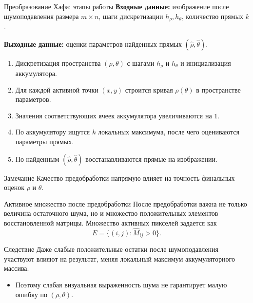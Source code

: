 \documentclass[unicode,notheorems]{beamer}
\begin{document}
\begin{frame}[shrink=5]{Преобразование Хафа: этапы работы}
	\textbf{Входные данные:} изображение после шумоподавления размера $m \times n$, шаги дискретизации $h_{\rho}, h_{\theta}$, количество прямых $k$.

	\vspace{0.1cm}
	\textbf{Выходные данные:} оценки параметров найденных прямых $(\hat{\rho},\hat{\theta})$.

	\vspace{0.2cm}
	\begin{enumerate}
		\item Дискретизация пространства $(\rho,\theta)$ с шагами $h_\rho$ и $h_\theta$ и инициализация аккумулятора.
		\item Для каждой активной точки $(x,y)$ строится кривая $\rho(\theta)$ в пространстве параметров.
		\item Значения соответствующих ячеек аккумулятора увеличиваются на $1$.
		\item По аккумулятору ищутся $k$ локальных максимума, после чего оцениваются параметры прямых.
		\item По найденным $(\hat{\rho},\hat{\theta})$ восстанавливаются прямые на изображении.
	\end{enumerate}

	\vspace{0.2cm}
	\begin{block}{Замечание}
		Качество предобработки напрямую влияет на точность финальных оценок $\rho$ и $\theta$.
	\end{block}
\end{frame}

\begin{frame}{Активное множество после предобработки}
	\small
	После предобработки важна не только величина остаточного шума, но и множество положительных элементов восстановленной матрицы.
	Множество активных пикселей задается как
	\[
	E = \{(i,j): \widehat{M}_{ij} > 0\}.
	\]

	\begin{block}{Следствие}
		Даже слабые положительные остатки после шумоподавления участвуют влияют на результат, меняя локальный максимум аккумуляторного массива.
	\end{block}

	\begin{itemize}
		\item Поэтому слабая визуальная выраженность шума не гарантирует малую ошибку по $(\rho,\theta)$.
	\end{itemize}
\end{frame}
\end{document}
